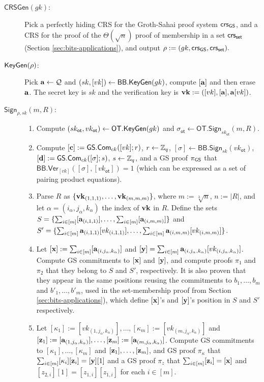 \begin{description}
\item[$\mathsf{CRSGen}(gk)$:] Pick a perfectly hiding CRS for the Groth-Sahai proof system $\mathsf{crs}_{\mathsf{GS}}$, and a CRS for the proof of the $\Theta(\sqrt{n})$ proof of membership in a set $\mathsf{crs}_{\mathsf{set}}$ (Section \ref{sec:bits-applications}), and output $\rho:=(gk,\mathsf{crs}_{\mathsf{GS}},\mathsf{crs}_{\mathsf{set}}).$
\item[$\mathsf{KeyGen}(\rho)$:] Pick $\mathbf{a}\gets\mathcal{Q}$ and $(sk,[vk])\gets\mathsf{BB}.\mathsf{KeyGen}(gk)$, compute $[\mathbf{a}]$ and then erase $\mathbf{a}$. The secret key is $sk$ and the verification key is $\mathbf{vk}:=([vk],[\mathbf{a}],\mathbf{a}[vk])$.
\item[$\mathsf{Sign}_{\rho,sk}(m,R)$:]
\begin{enumerate}
\item Compute $(sk_\mathsf{ot},vk_\mathsf{ot})\gets\mathsf{OT}.\mathsf{KeyGen}(gk)$ and $\sigma_\mathsf{ot}\gets\allowbreak\mathsf{OT}.\allowbreak\mathsf{Sign}_{sk_\mathsf{ot}}(m,R)$.
\item Compute $[\mathbf{c}]:={\mathsf{GS}}.\mathsf{Com}_{ck}([vk];r)$, $r\gets\mathbb{Z}_q$, $[\sigma]\gets\mathsf{BB}.\mathsf{Sign}_{sk}(vk_\mathsf{ot})$, $[\mathbf{d}]:={\mathsf{GS}}.\mathsf{Com}_{ck}([\sigma];s)$, $s\gets\mathbb{Z}_q$, and a GS proof $\pi_{\mathsf{GS}}$ that $\mathsf{BB}.\mathsf{Ver}_{[vk]}(\allowbreak[\sigma],[vk_\mathsf{ot}])=1$ (which can be expressed as a set of pairing product equations).
\item Parse $R$ as $\{\mathbf{vk}_{(1,1,1)},\ldots,\mathbf{vk}_{(m,m,m)}\}$, where $m:=\sqrt[3]{n}$, $n:=|R|$, and let $\alpha=(i_\alpha,j_\alpha,k_\alpha)$ the index of $\mathbf{vk}$ in $R$. Define the sets $S=\{\sum_{i\in[m]}[\mathbf{a}_{(i,1,1)}],\allowbreak\ldots,\sum_{i\in[m]}[\mathbf{a}_{(i,m,m)}]\}$ and\\ $S'=\{\sum_{i\in[m]}\mathbf{a}_{(i,1,1)}[vk_{(i,1,1)}],\allowbreak\ldots,\sum_{i\in[m]}\mathbf{a}_{(i,m,m)}[vk_{(i,m,m)}]\}$.
\item Let $[\mathbf{x}]:=\sum_{i\in[m]}[\mathbf{a}_{(i,j_\alpha,k_\alpha)}]$ and $[\mathbf{y}]=\sum_{i\in[m]}\mathbf{a}_{(i,j_\alpha,k_\alpha)}[vk_{(i,j_\alpha,k_\alpha)}]$. Compute GS commitments to $[\mathbf{x}]$ and $[\mathbf{y}]$, and compute proofs $\pi_1$ and $\pi_2$ that they belong to $S$ and $S'$, respectively. It is also proven that they appear in the same positions reusing the commitments to $b_1,\ldots,b_{m}$ and $b'_1,\ldots,b'_{m}$, used in the set-membership proof from Section \ref{sec:bits-applications}), which define $[\mathbf{x}]$'s and $[\mathbf{y}]$'s position in $S$ and $S'$ respectively.
\item Let $[\kappa_1]:=[vk_{(1,j_\alpha,k_\alpha)}],\ldots,[\kappa_m]:=[vk_{(m,j_\alpha,k_\alpha)}]$ and $[\mathbf{z}_1]:=\allowbreak[\mathbf{a}_{(1,j_\alpha,k_\alpha)}],\allowbreak\ldots,[\mathbf{z}_m]:=[\mathbf{a}_{(m,j_\alpha,k_\alpha)}]$. Compute GS commitments to $[\kappa_1],\ldots,[\kappa_m]$ and $[\mathbf{z}_1],\ldots,[\mathbf{z}_m]$, and GS proof $\pi_\kappa$ that $\sum_{i\in[m]}[\kappa_i][\mathbf{z}_i]=[\mathbf{y}][1]$ and a GS proof $\pi_{z}$ that $\sum_{i\in[m]}[\mathbf{z}_i]=[\mathbf{x}]$ and $[z_{2,i}][1]=[z_{1,i}][z_{1,i}]$ for each $i\in[m]$.

\end{enumerate}
\end{description}
